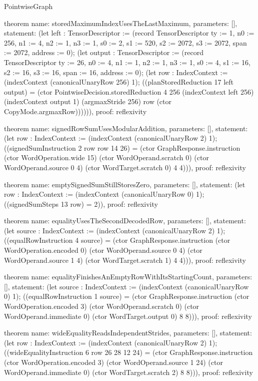 \begin{lexlean}{PointwiseGraph}
\begin{semanticmodule}
theorem{
  name: storedMaximumIndexUsesTheLastMaximum,
  parameters: [],
  statement: (let left : TensorDescriptor := (record TensorDescriptor {ty := 1, n0 := 256, n1 := 4, n2 := 1, n3 := 1, s0 := 2, s1 := 520, s2 := 2072, s3 := 2072, span := 2072, address := 0}); (let output : TensorDescriptor := (record TensorDescriptor {ty := 26, n0 := 4, n1 := 1, n2 := 1, n3 := 1, s0 := 4, s1 := 16, s2 := 16, s3 := 16, span := 16, address := 0}); (let row : IndexContext := (indexContext (canonicalUnaryRow 256) 1); ((planStoredReduction 17 left output) = (ctor PointwiseDecision.storedReduction 4 256 (indexContext left 256) (indexContext output 1) (argmaxStride 256) row (ctor CopyMode.argmaxRow)))))),
  proof: reflexivity{}
}

theorem{
  name: signedRowSumUsesModularAddition,
  parameters: [],
  statement: (let row : IndexContext := (indexContext (canonicalUnaryRow 2) 1); ((signedSumInstruction 2 row row 14 26) = (ctor GraphResponse.instruction (ctor WordOperation.wide 15) (ctor WordOperand.scratch 0) (ctor WordOperand.source 0 4) (ctor WordTarget.scratch 0) 4 4))),
  proof: reflexivity{}
}

theorem{
  name: emptySignedSumStillStoresZero,
  parameters: [],
  statement: (let row : IndexContext := (indexContext (canonicalUnaryRow 0) 1); ((signedSumSteps 13 row) = 2)),
  proof: reflexivity{}
}

theorem{
  name: equalityUsesTheSecondDecodedRow,
  parameters: [],
  statement: (let source : IndexContext := (indexContext (canonicalUnaryRow 2) 1); ((equalRowInstruction 4 source) = (ctor GraphResponse.instruction (ctor WordOperation.encoded 0) (ctor WordOperand.source 0 4) (ctor WordOperand.source 1 4) (ctor WordTarget.scratch 1) 4 4))),
  proof: reflexivity{}
}

theorem{
  name: equalityFinishesAnEmptyRowWithItsStartingCount,
  parameters: [],
  statement: (let source : IndexContext := (indexContext (canonicalUnaryRow 0) 1); ((equalRowInstruction 1 source) = (ctor GraphResponse.instruction (ctor WordOperation.encoded 3) (ctor WordOperand.scratch 0) (ctor WordOperand.immediate 0) (ctor WordTarget.output 0) 8 8))),
  proof: reflexivity{}
}

theorem{
  name: wideEqualityReadsIndependentStrides,
  parameters: [],
  statement: (let row : IndexContext := (indexContext (canonicalUnaryRow 2) 1); ((wideEqualityInstruction 6 row 26 28 12 24) = (ctor GraphResponse.instruction (ctor WordOperation.encoded 3) (ctor WordOperand.source 1 24) (ctor WordOperand.immediate 0) (ctor WordTarget.scratch 2) 8 8))),
  proof: reflexivity{}
}


\end{semanticmodule}
\end{lexlean}
